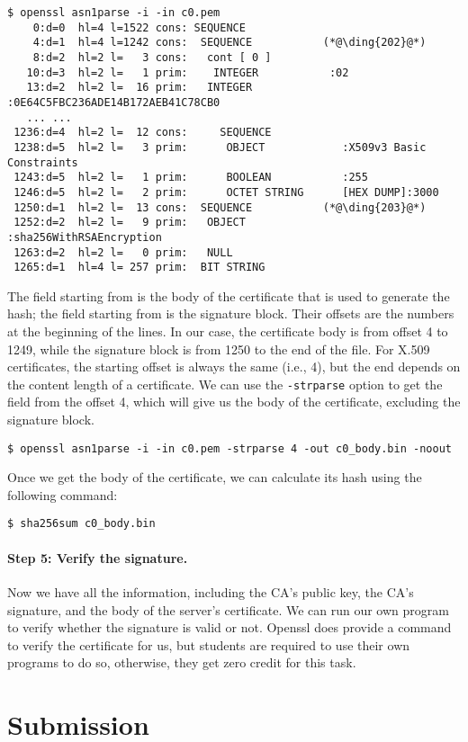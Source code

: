 \begin{lstlisting}
$ openssl asn1parse -i -in c0.pem
    0:d=0  hl=4 l=1522 cons: SEQUENCE
    4:d=1  hl=4 l=1242 cons:  SEQUENCE           (*@\ding{202}@*)
    8:d=2  hl=2 l=   3 cons:   cont [ 0 ]
   10:d=3  hl=2 l=   1 prim:    INTEGER           :02
   13:d=2  hl=2 l=  16 prim:   INTEGER           :0E64C5FBC236ADE14B172AEB41C78CB0
   ... ...
 1236:d=4  hl=2 l=  12 cons:     SEQUENCE
 1238:d=5  hl=2 l=   3 prim:      OBJECT            :X509v3 Basic Constraints
 1243:d=5  hl=2 l=   1 prim:      BOOLEAN           :255
 1246:d=5  hl=2 l=   2 prim:      OCTET STRING      [HEX DUMP]:3000
 1250:d=1  hl=2 l=  13 cons:  SEQUENCE           (*@\ding{203}@*)
 1252:d=2  hl=2 l=   9 prim:   OBJECT            :sha256WithRSAEncryption
 1263:d=2  hl=2 l=   0 prim:   NULL
 1265:d=1  hl=4 l= 257 prim:  BIT STRING
\end{lstlisting}


The field starting from  is the body of the certificate that is used to generate the hash; the
field starting from  is the signature block. Their offsets are the numbers at the beginning
of the lines. In our case, the certificate body is from offset 4 to 1249, while the
signature block is from 1250 to the end of the file. For X.509 certificates, the starting
offset is always the same (i.e., 4), but the end depends on the content length of a
certificate.  We can use the
\texttt{-strparse} option to get the field from the offset 4, which will give us the body of
the certificate, excluding the signature block.

\begin{lstlisting}
$ openssl asn1parse -i -in c0.pem -strparse 4 -out c0_body.bin -noout
\end{lstlisting}

Once we get the body of the certificate, we can calculate its hash using the following
command:

\begin{lstlisting}
$ sha256sum c0_body.bin
\end{lstlisting}



\paragraph{Step 5: Verify the signature.}
Now we have all the information, including the CA's public key, the CA's signature, and the
body of the server's certificate. We can run our own program to verify whether the
signature is valid or not. Openssl does provide a command to verify the certificate for
us, but students are required to use their own programs to do so, otherwise, they get zero
credit for this task.


\section{Submission}





